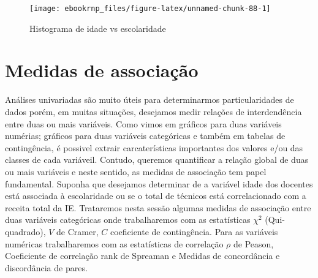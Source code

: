 \documentclass[11pt,]{style/krantz}
\makeatletter
\newenvironment{Shaded}{\begin{snugshade}}{\end{snugshade}}
\newcommand{\DataTypeTok}[1]{\textcolor[rgb]{0.13,0.29,0.53}{#1}}
\newcommand{\DecValTok}[1]{\textcolor[rgb]{0.00,0.00,0.81}{#1}}
\newcommand{\KeywordTok}[1]{\textcolor[rgb]{0.13,0.29,0.53}{\textbf{#1}}}
\newcommand{\NormalTok}[1]{#1}
\newcommand{\OperatorTok}[1]{\textcolor[rgb]{0.81,0.36,0.00}{\textbf{#1}}}
\newcommand{\OtherTok}[1]{\textcolor[rgb]{0.56,0.35,0.01}{#1}}
\newcommand{\StringTok}[1]{\textcolor[rgb]{0.31,0.60,0.02}{#1}}
\newenvironment{kframe}{%
\medskip{}
\setlength{\fboxsep}{.8em}
 \def\at@end@of@kframe{}%
 \ifinner\ifhmode%
  \def\at@end@of@kframe{\end{minipage}}%
  \begin{minipage}{\columnwidth}%
 \fi\fi%
 \def\FrameCommand##1{\hskip\@totalleftmargin \hskip-\fboxsep
 \colorbox{shadecolor}{##1}\hskip-\fboxsep
     \hskip-\linewidth \hskip-\@totalleftmargin \hskip\columnwidth}%
 \MakeFramed {\advance\hsize-\width
   \@totalleftmargin\z@ \linewidth\hsize
   \@setminipage}}%
 {\par\unskip\endMakeFramed%
 \at@end@of@kframe}
\renewenvironment{Shaded}{\begin{kframe}}{\end{kframe}}
\theoremstyle{definition}
\theoremstyle{definition}
\theoremstyle{definition}
\theoremstyle{remark}
\makeatother
\begin{document}
\begin{Shaded}
\end{Shaded}

\begin{figure}[H]

{\centering \texttt{[image: ebookrnp\_files/figure-latex/unnamed-chunk-88-1]}

}

\caption{Histograma de idade vs escolaridade}\label{fig:unnamed-chunk-88}
\end{figure}

\hypertarget{medidas-de-associacao}{%
\section{Medidas de associação}\label{medidas-de-associacao}}

Análises univariadas são muito úteis para determinarmos particularidades de dados porém, em muitas situações, desejamos medir relações de interdendência entre duas ou mais variáveis. Como vimos em gráficos para duas variáveis numérias; gráficos para duas variáveis categóricas e também em tabelas de contingência, é possivel extrair carcaterísticas importantes dos valores e/ou das classes de cada variáveil. Contudo, queremos quantificar a relação global de duas ou mais variáveis e neste sentido, as medidas de associação tem papel fundamental. Suponha que desejamos determinar de a variável idade dos docentes está associada à escolaridade ou se o total de técnicos está correlacionado com a receita total da IE.
Trataremos nesta sessão algumas medidas de associação entre duas variáveis categóricas onde trabalharemos com as estatísticas \(\chi^2\) (Qui-quadrado), \(V\) de Cramer, \(C\) coeficiente de contingência. Para as variáveis numéricas trabalharemos com as estatísticas de correlação \(\rho\) de Peason, Coeficiente de correlação rank de Spreaman e Medidas de concordância e discordância de pares.
\end{document}

